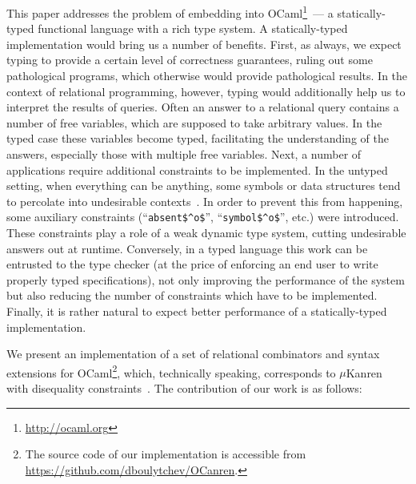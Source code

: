 This paper addresses the problem of embedding \miniKanren into OCaml\footnote{\url{http://ocaml.org}}~--- a statically-typed functional language with
a rich type system. A statically-typed implementation would bring us a number of benefits. First, as always,
we expect typing to provide a certain level of correctness guarantees, ruling out some pathological programs, which
otherwise would provide pathological results. In the context of relational programming, however, typing would additionally
help us to interpret the results of queries. Often an answer to a relational query contains a number of
free variables, which are supposed to take arbitrary values. In the typed case these variables become typed,
facilitating the understanding of the answers, especially those with multiple free variables. Next, a number of \miniKanren
applications require additional constraints to be implemented. In the untyped setting, when everything can be anything,
some symbols or data structures tend to percolate into undesirable contexts~\cite{Untagged}. In order to prevent this from happening, some
auxiliary constraints (``\lstinline{absent$^o$}'', ``\lstinline{symbol$^o$}'', etc.) were introduced. These constraints play a role
of a weak dynamic type system, cutting undesirable answers out at runtime. Conversely, in a typed language this work can be
entrusted to the type checker (at the price of enforcing an end user to write properly typed specifications), not only improving the
performance of the system but also reducing the number of constraints which have to be implemented. Finally, it is rather natural
to expect better performance of a statically-typed implementation.

We present an implementation of a set of relational combinators and syntax extensions for
OCaml\footnote{The source code of our implementation is accessible from \url{https://github.com/dboulytchev/OCanren}.},
which, technically speaking, corresponds to $\mu$Kanren~\cite{MicroKanren} with disequality
constraints~\cite{CKanren}. The contribution of our work is as follows:


